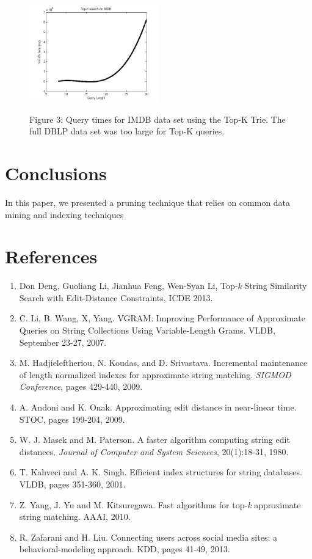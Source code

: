 \documentclass[pdftex,12pt,letter]{article}
\begin{document}
\begin{figure}[h!]
\centering
\includegraphics[width=0.5\textwidth]{TOPKonIMDB.jpg}
\begin{center}
Figure 3: Query times for IMDB data set using the Top-K Trie. The full DBLP data set was too large for Top-K queries.
\end{center}
\end{figure}

\newpage
\section{Conclusions}
In this paper, we presented a pruning technique that relies on common data mining and indexing techniques

\section{References}
\begin{enumerate}
\item Don Deng, Guoliang Li, Jianhua Feng, Wen-Syan Li, Top-\textit{k} String Similarity Search with Edit-Distance Constraints, ICDE 2013.
\item C. Li, B. Wang, X, Yang. VGRAM: Improving Performance of Approximate Queries on String Collections Using Variable-Length Grams. VLDB, September 23-27, 2007.
\item M. Hadjieleftheriou, N. Koudas, and D. Srivastava. Incremental maintenance of length normalized indexes for approximate string matching. \textit{SIGMOD Conference}, pages 429-440, 2009.
\item A. Andoni and K. Onak. Approximating edit distance in near-linear time. STOC, pages 199-204, 2009.
\item W. J. Masek and M. Paterson. A faster algorithm computing string edit distances. \textit{Journal of Computer and System Sciences}, 20(1):18-31, 1980.
\item T. Kahveci and A. K. Singh. Efficient index structures for string databases. VLDB, pages 351-360, 2001.
\item Z. Yang, J. Yu and M. Kitsuregawa. Fast algorithms for top-\textit{k} approximate string matching. AAAI, 2010.
\item R. Zafarani and H. Liu. Connecting users across social media sites: a behavioral-modeling approach. KDD, pages 41-49, 2013.
\end{enumerate}

\FloatBarrier
\end{document}
